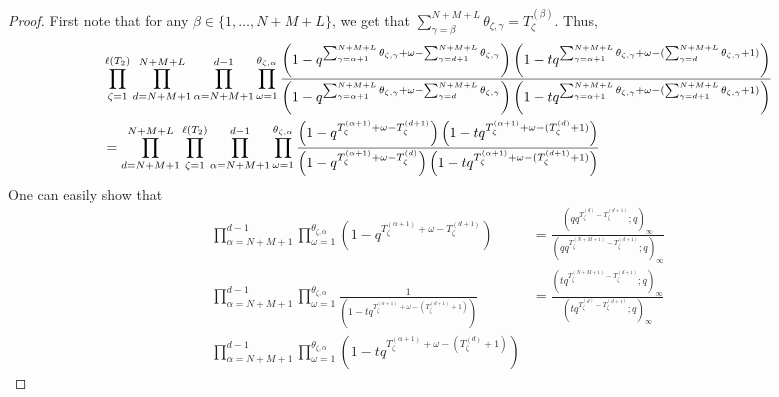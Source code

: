 \documentclass[12pt,reqno,a4paper]{amsart}
\numberwithin{equation}{section}
\theoremstyle{definition}
\begin{document}
\begin{proof}
First note that for any $\beta \in \{1,\dots,N+M+L\}$, we get that $\sum_{\gamma = \beta}^{N+M+L}\theta_{\zeta,\gamma} = T^{(\beta)}_{\zeta}$. Thus, 
\footnotesize
\begin{align}
	&\prod_{\zeta = 1}^{\ell(T_2)}
	\prod_{d = N+M+1}^{N+M+L}
	\prod_{\alpha = N+M+1}^{d - 1} 
	\prod_{\omega = 1}^{\theta_{\zeta,\alpha}}
	\frac{
		\left(	1 - q^{	\sum_{\gamma = \alpha + 1}^{N + M + L} \theta_{\zeta,\gamma}	+ \omega - \sum_{\gamma = d+1}^{N + M + L}\theta_{\zeta,\gamma} 		}			\right)
		\left(	1 - tq^{	\sum_{\gamma = \alpha + 1}^{N + M + L} \theta_{\zeta,\gamma}	+ \omega - (\sum_{\gamma = d}^{N + M + L}\theta_{\zeta,\gamma} 	+ 1 )	}		\right)
	}{
		\left(	1 - q^{	\sum_{\gamma = \alpha + 1}^{N + M + L} \theta_{\zeta,\gamma}	+ \omega - \sum_{\gamma = d}^{N + M + L}\theta_{\zeta,\gamma} 		}			\right)
		\left(	1 - 	tq^{	\sum_{\gamma = \alpha + 1}^{N + M + L} \theta_{\zeta,\gamma}	+ \omega - (\sum_{\gamma = d + 1}^{N + M + L}\theta_{\zeta,\gamma} 	+ 1 )	}			\right)
	}
	\notag 
	\\
	&=
	\prod_{d = N+M+1}^{N+M+L}
	\prod_{\zeta = 1}^{\ell(T_2)}
	\prod_{\alpha = N+M+1}^{d - 1} 
	\prod_{\omega = 1}^{\theta_{\zeta,\alpha}}
	\frac{
		\left(	1 - q^{		T^{(\alpha + 1)}_{\zeta}		+ \omega - T^{(d+1)}_{\zeta}	}			\right)
		\left(	1 - tq^{	T^{(\alpha + 1)}_{\zeta}		+ \omega - (	T^{(d)}_{\zeta}	+ 1 )	}		\right)
	}{
		\left(	1 - q^{	T^{(\alpha + 1)}_{\zeta}		+ \omega - T^{(d)}_{\zeta}		}			\right)
		\left(	1 - 	tq^{	T^{(\alpha + 1)}_{\zeta}		+ \omega - (	T^{(d+1)}_{\zeta}	+ 1 )	}			\right)
	}
\end{align}
\normalsize
One can easily show that 
\footnotesize
\begin{align}
\prod_{\alpha = N+M+1}^{d - 1} 
\prod_{\omega = 1}^{\theta_{\zeta,\alpha}}
\left(	1 - q^{		T^{(\alpha + 1)}_{\zeta}		+ \omega - T^{(d+1)}_{\zeta}	}			\right)
&= 
\frac{
	\left(	qq^{T^{(d)}_{\zeta} - T^{(d+1)}_{\zeta}}	; q	\right)_\infty
}{
	\left(	qq^{T^{(N+M+1)}_{\zeta} - T^{(d+1)}_{\zeta}}	; q	\right)_\infty
}
\\
\prod_{\alpha = N+M+1}^{d - 1} 
\prod_{\omega = 1}^{\theta_{\zeta,\alpha}}
\frac{
	1
}{
	\left(	1 - 	tq^{	T^{(\alpha + 1)}_{\zeta}		+ \omega - (	T^{(d+1)}_{\zeta}	+ 1 )	}			\right)
}
&=
\frac{
	\left(	tq^{T^{(N+M+1)}_{\zeta} - T^{(d+1)}_{\zeta}}	; q	\right)_\infty
}{
	\left(	tq^{T^{(d)}_{\zeta} - T^{(d+1)}_{\zeta}}	; q	\right)_\infty
}
\\
\prod_{\alpha = N+M+1}^{d - 1} 
\prod_{\omega = 1}^{\theta_{\zeta,\alpha}}
\left(	1 - tq^{	T^{(\alpha + 1)}_{\zeta}		+ \omega - (	T^{(d)}_{\zeta}	+ 1 )	}		\right)

\end{align}
\end{proof}
\end{document}
